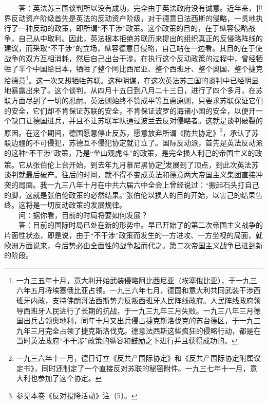 \documentclass[cn,11pt,chinese]{elegantbook}
\begin{document}
　　答：英法苏三国谈判所以没有成功，完全由于英法政府没有诚意。近年来，世界反动资产阶级首先是英法的反动资产阶级，对于德意日法西斯的侵略，一贯地执行了一种反动的政策，即所谓“不干涉”政策。这个政策的目的，在于纵容侵略战争，自己从中取利。因此，英法根本拒绝苏联历来提出的组织真正的反侵略阵线的建议，而采取“不干涉”的立场，纵容德意日侵略，自己站在一边看。其目的在于使战争的双方互相消耗，然后自己出台干涉。在执行这个反动政策的过程中，曾经牺牲了半个中国给日本，牺牲了整个阿比西尼亚、整个西班牙、整个奥国、整个捷克给德意\footnote[4]{ 一九三五年十月，意大利开始武装侵略阿比西尼亚（埃塞俄比亚），于一九三六年五月将埃塞俄比亚占领。一九三六年七月，德国和意大利共同武装干涉西班牙内政，支持佛朗哥法西斯势力反叛西班牙人民阵线政府。人民阵线政府领导西班牙人民进行了长期的抗战，于一九三九年三月失败。一九三八年三月德国出兵占领奥地利，同年十月又出兵侵占捷克斯洛伐克的苏台德区，于一九三九年三月完全占领了捷克斯洛伐克。德意法西斯这些疯狂的侵略行动，都是在当时英法政府“不干涉”政策的纵容和鼓励之下进行并且获得成功的。}。这一次又想牺牲苏联。这种阴谋，在这次英法苏三国的谈判中已经明显地暴露出来了。这个谈判，从四月十五日到八月二十三日，进行了四个多月，在苏联方面尽到了一切的忍耐。英法则始终不赞成平等互惠原则，只要求苏联保证它们的安全，它们却不肯保证苏联的安全，不肯保证波罗的海诸小国的安全，以便开一个缺口让德国进兵，并且不让苏联军队通过波兰去反对侵略者。这就是谈判破裂的原因。在这个期间，德国愿意停止反苏，愿意放弃所谓《防共协定》\footnote[5]{ 一九三六年十一月，德日订立《反共产国际协定》和《反共产国际协定附属议定书》，同时还制定了一个直接反对苏联的秘密附件。一九三七年十一月，意大利也参加了这个协定。}，承认了苏联边疆的不可侵犯，苏德互不侵犯协定就订立了。国际反动派，首先是英法反动派的这种“不干涉”政策，乃是“坐山观虎斗”的政策，是完全损人利己的帝国主义的政策。它从张伯伦上台开始，到去年九月慕尼黑协定\footnote[6]{ 参见本卷《反对投降活动》注〔5〕。}发展到了顶点，到此次英法苏谈判就最后破产。往后的时间，就不得不变成英法和德意两大帝国主义集团直接冲突的局面。我一九三八年十月在中共六届六中全会上曾经说过：“搬起石头打自己的脚，这就是张伯伦政策的必然结果。”张伯伦以损人的目的开始，以害己的结果告终。这将是一切反动政策的发展规律。\\
　　问：据你看，目前的时局将要如何发展？\\
　　答：目前的国际时局已处在新的形势中。早已开始了的第二次帝国主义战争的片面性状态，即是说，由于“不干涉”政策而发生的一方进攻、一方坐视的局面，就欧洲方面说来，今后势必由全面性的战争起而代之。第二次帝国主义战争已进到新的阶段。\\
\end{document}
